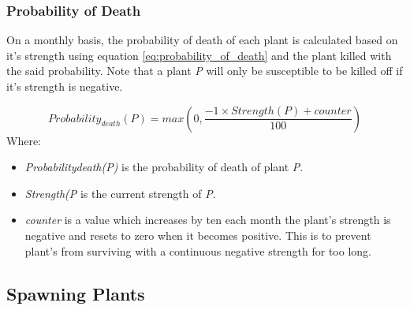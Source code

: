 \subsubsection{Probability of Death}

On a monthly basis, the probability of death of each plant is calculated based on it's strength using equation \ref{eq:probability_of_death} and the plant killed with the said probability. Note that a plant \textit{P} will only be susceptible to be killed off if it's strength is negative. 

\begin{equation}
Probability_{death}(P) = max(0, \frac{-1 \times Strength(P) + counter}{100})
\label{eq:probability_of_death}
\end{equation}
Where:
\begin{itemize}
\item \textit{Probability{death}(P)} is the probability of death of plant \textit{P}.
\item \textit{Strength(\textit{P}} is the current strength of \textit{P}.
\item \textit{counter} is a value which increases by ten each month the plant's strength is negative and resets to zero when it becomes positive. This is to prevent plant's from surviving with a continuous negative strength for too long.
\end{itemize}

\subsection{Spawning Plants}

